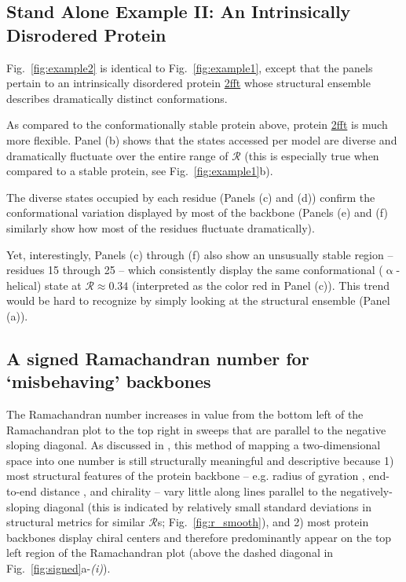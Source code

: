 \documentclass[fleqn,10pt,lineno]{wlpeerj} %
\newcommand{\Fig}[1]{Fig.~\ref{#1}}
\newcommand{\rr}{$\mathcal{R}$\xspace}
\begin{document}
\subsection*{Stand Alone Example II: An Intrinsically Disrodered Protein}

\Fig{fig:example2} is identical to \Fig{fig:example1}, except that the panels pertain to an intrinsically disordered protein \href{https://www.rcsb.org/structure/2FFT}{2fft} whose structural ensemble describes dramatically distinct conformations. 

As compared to the conformationally stable protein above, protein \href{https://www.rcsb.org/structure/2FFT}{2fft} is much more flexible. Panel (b) shows that the states accessed per model are diverse and dramatically fluctuate over the entire range of $\mathcal{R}$ (this is especially true when compared to a stable protein, see \Fig{fig:example1}b). 

The diverse states occupied by each residue (Panels (c) and (d)) confirm the conformational variation displayed by most of the backbone (Panels (e) and (f) similarly show how most of the residues fluctuate dramatically).

Yet, interestingly, Panels (c) through (f) also show an unsusually stable region -- residues 15 through 25 -- which consistently display the same conformational ($\upalpha$-helical) state at $\mathcal{R}\approx0.34$ (interpreted as the color red in Panel (c)). This trend would be hard to recognize by simply looking at the structural ensemble (Panel (a)). 

\subsection*{A signed Ramachandran number for `misbehaving' backbones}

The Ramachandran number increases in value from the bottom left of the Ramachandran plot to the top right in sweeps that are parallel to the negative sloping diagonal. As discussed in \cite{Mannige2016}, this method of mapping a two-dimensional space into one number is still structurally meaningful and descriptive because 1) most structural features of the protein backbone -- e.g. radius of gyration \citep{Mannige2016}, end-to-end distance \citep{Mannige2016}, and chirality \citep{Mannige2017} -- vary little along lines parallel to the negatively-sloping diagonal (this is indicated by relatively small standard deviations in structural metrics for similar {\rr}s; \Fig{fig:r_smooth}), and 2) most protein backbones display chiral centers and therefore predominantly appear on the top left region of the Ramachandran plot (above the dashed diagonal in \Fig{fig:signed}a-{\it(i)}).
\end{document}
